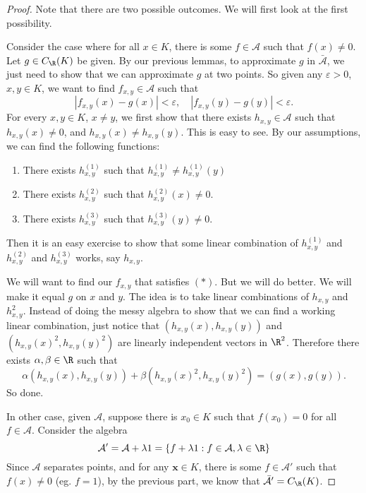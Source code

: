 \documentclass[a4paper]{article}
\begin{document}
\begin{proof}
  Note that there are two possible outcomes. We will first look at the first possibility.

  Consider the case where for all $x \in K$, there is some $f \in \mathcal{A}$ such that $f(x) \not= 0$. Let $g \in C_{\R}(K)$ be given. By our previous lemmas, to approximate $g$ in $\bar{\mathcal{A}}$, we just need to show that we can approximate $g$ at two points. So given any $\varepsilon > 0$, $x, y \in K$, we want to find $f_{x, y} \in \mathcal{A}$ such that
  \[
    |f_{x, y}(x) - g(x)| < \varepsilon,\quad |f_{x, y}(y) - g(y)| < \varepsilon. \tag{$*$}
  \]
  For every $x, y \in K$, $x \not= y$, we first show that there exists $h_{x, y} \in \mathcal{A}$ such that $h_{x, y}(x) \not= 0$, and $h_{x, y}(x) \not= h_{x, y}(y)$. This is easy to see. By our assumptions, we can find the following functions:
  \begin{enumerate}
    \item There exists $h_{x, y}^{(1)}$ such that $h_{x, y}^{(1)} \not= h_{x, y}^{(1)}(y)$
    \item There exists $h_{x, y}^{(2)}$ such that $h_{x, y}^{(2)}(x) \not= 0$.
    \item There exists $h_{x, y}^{(3)}$ such that $h_{x, y}^{(3)}(y) \not= 0$.
  \end{enumerate}
  Then it is an easy exercise to show that some linear combination of $h_{x, y}^{(1)}$ and $h_{x, y}^{(2)}$ and $h_{x, y}^{(3)}$ works, say $h_{x, y}$.

  We will want to find our $f_{x, y}$ that satisfies $(*)$. But we will do better. We will make it equal $g$ on $x$ and $y$. The idea is to take linear combinations of $h_{x, y}$ and $h_{x, y}^2$. Instead of doing the messy algebra to show that we can find a working linear combination, just notice that $(h_{x, y}(x), h_{x, y}(y))$ and $(h_{x, y}(x)^2, h_{x, y}(y)^2)$ are linearly independent vectors in $\R^2$. Therefore there exists $\alpha, \beta \in \R$ such that
  \[
    \alpha(h_{x, y}(x), h_{x, y}(y)) + \beta(h_{x, y}(x)^2, h_{x, y}(y)^2) = (g(x), g(y)).
  \]
  So done.

  In other case, given $\mathcal{A}$, suppose there is $x_0 \in K$ such that $f(x_0) = 0$ for all $f \in \mathcal{A}$. Consider the algebra
  \[
    \mathcal{A}' = \mathcal{A} + \lambda 1 = \{f + \lambda 1: f \in \mathcal{A}, \lambda \in \R\}
  \]
  Since $\mathcal{A}$ separates points, and for any $\mathbf{x} \in K$, there is some $f \in \mathcal{A}'$ such that $f(x) \not= 0$ (eg. $f = 1$), by the previous part, we know that $\bar{\mathcal{A}}' = C_{\R}(K)$.


\end{proof}
\end{document}

